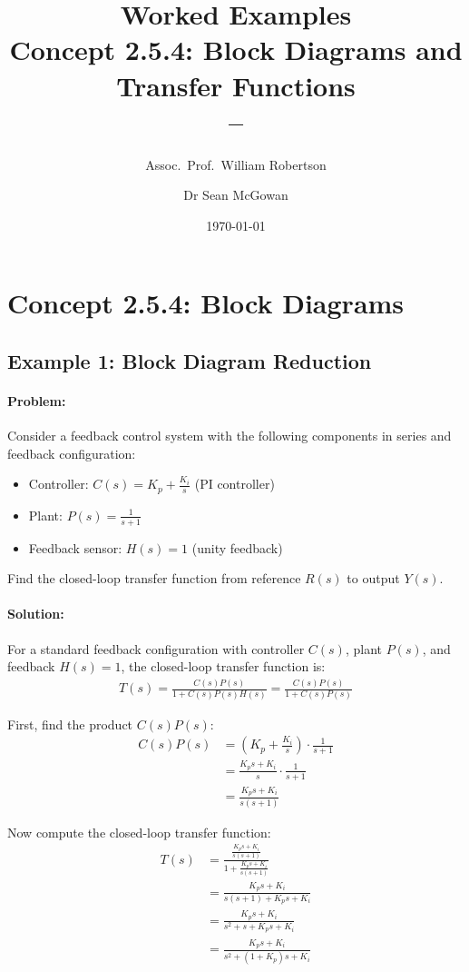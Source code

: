 \documentclass[11pt,a4paper]{article}
\title{\textbf{Worked Examples}\\[0.5em]
\large Concept 2.5.4: Block Diagrams and Transfer Functions\\[0.3em]
\normalsize \coursesubtitle{} -- \coursetitle}
\author{Assoc.\ Prof.\ William Robertson \and Dr Sean McGowan}
\date{\today}
\begin{document}
\maketitle
\tableofcontents
\newpage

\section{Concept 2.5.4: Block Diagrams}

\subsection{Example 1: Block Diagram Reduction}

\paragraph{Problem:} Consider a feedback control system with the following components in series and feedback configuration:
\begin{itemize}
  \item Controller: $C(s) = K_p + \frac{K_i}{s}$ (PI controller)
  \item Plant: $P(s) = \frac{1}{s+1}$
  \item Feedback sensor: $H(s) = 1$ (unity feedback)
\end{itemize}

Find the closed-loop transfer function from reference $R(s)$ to output $Y(s)$.

\paragraph{Solution:}

For a standard feedback configuration with controller $C(s)$, plant $P(s)$, and feedback $H(s) = 1$, the closed-loop transfer function is:
\begin{align}
  T(s) = \frac{C(s)P(s)}{1 + C(s)P(s)H(s)} = \frac{C(s)P(s)}{1 + C(s)P(s)}
\end{align}

First, find the product $C(s)P(s)$:
\begin{align}
  C(s)P(s) &= \left(K_p + \frac{K_i}{s}\right) \cdot \frac{1}{s+1} \\
  &= \frac{K_ps + K_i}{s} \cdot \frac{1}{s+1} \\
  &= \frac{K_ps + K_i}{s(s+1)}
\end{align}

Now compute the closed-loop transfer function:
\begin{align}
  T(s) &= \frac{\frac{K_ps + K_i}{s(s+1)}}{1 + \frac{K_ps + K_i}{s(s+1)}} \\
  &= \frac{K_ps + K_i}{s(s+1) + K_ps + K_i} \\
  &= \frac{K_ps + K_i}{s^2 + s + K_ps + K_i} \\
  &= \frac{K_ps + K_i}{s^2 + (1+K_p)s + K_i}
\end{align}
\end{document}
